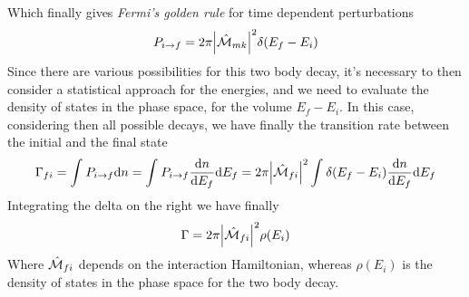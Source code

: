 \documentclass[../qm.tex]{subfiles}
\begin{document}
Which finally gives \emph{Fermi's golden rule} for time dependent perturbations
\begin{equation}
	P_{i\to f}=2\pi\abs{\hat{\mathcal{M}}_{mk}}^2\delta(E_f-E_i)
	\label{eq:fermigoldenruledecay}
\end{equation}
Since there are various possibilities for this two body decay, it's necessary to then consider a statistical approach for the energies, and we need to evaluate the density of states in the phase space, for the volume $E_f-E_i$. In this case, considering then all possible decays, we have finally the transition rate between the initial and the final state
\begin{equation*}
	\Gamma_{fi}=\int_{}^{}P_{i\to f}\dd n=\int_{}^{}P_{i\to f}\dv{n}{E_f}\dd E_f=2\pi\abs{\hat{\mathcal{M}}_{fi}}^2\int_{}^{}\delta(E_f-E_i)\dv{n}{E_f}\dd E_f
\end{equation*}
Integrating the delta on the right we have finally
\begin{equation}
	\Gamma=2\pi\abs{\hat{\mathcal{M}}_{fi}}^2\rho(E_i)
	\label{eq:decayratefinal}
\end{equation}
Where $\hat{\mathcal{M}}_{fi}$ depends on the interaction Hamiltonian, whereas $\rho(E_i)$ is the density of states in the phase space for the two body decay.
\end{document}
